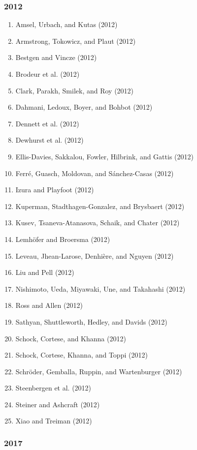 \documentclass[english,man]{apa6}
\providecommand{\tightlist}{%
  \setlength{\itemsep}{0pt}\setlength{\parskip}{0pt}}
\begin{document}
\subsubsection{2012}\label{section-32}

\begin{enumerate}
\def\labelenumi{\arabic{enumi})}
\tightlist
\item
  Amsel, Urbach, and Kutas (2012)
\item
  Armstrong, Tokowicz, and Plaut (2012)
\item
  Bestgen and Vincze (2012)
\item
  Brodeur et al. (2012)
\item
  Clark, Parakh, Smilek, and Roy (2012)
\item
  Dahmani, Ledoux, Boyer, and Bohbot (2012)
\item
  Dennett et al. (2012)
\item
  Dewhurst et al. (2012)
\item
  Ellis-Davies, Sakkalou, Fowler, Hilbrink, and Gattis (2012)
\item
  Ferré, Guasch, Moldovan, and Sánchez-Casas (2012)
\item
  Izura and Playfoot (2012)
\item
  Kuperman, Stadthagen-Gonzalez, and Brysbaert (2012)
\item
  Kusev, Tsaneva-Atanasova, Schaik, and Chater (2012)
\item
  Lemhöfer and Broersma (2012)
\item
  Leveau, Jhean-Larose, Denhière, and Nguyen (2012)
\item
  Liu and Pell (2012)
\item
  Nishimoto, Ueda, Miyawaki, Une, and Takahashi (2012)
\item
  Ross and Allen (2012)
\item
  Sathyan, Shuttleworth, Hedley, and Davids (2012)
\item
  Schock, Cortese, and Khanna (2012)
\item
  Schock, Cortese, Khanna, and Toppi (2012)
\item
  Schröder, Gemballa, Ruppin, and Wartenburger (2012)
\item
  Steenbergen et al. (2012)
\item
  Steiner and Ashcraft (2012)
\item
  Xiao and Treiman (2012)
\end{enumerate}

\subsubsection{2017}\label{section-33}
\end{document}
